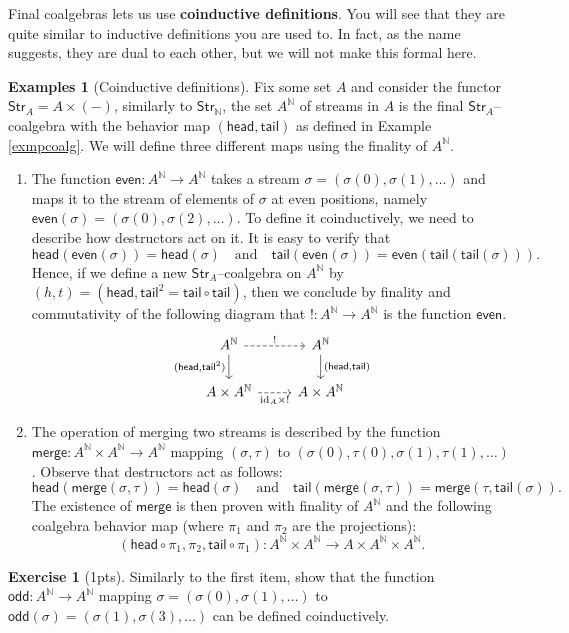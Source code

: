 \documentclass{article}
\theoremstyle{definition}
\newtheorem{exmps}[thm]{Examples}
\newtheorem{exer}{Exercise}
\theoremstyle{remark}
\newcommand{\N}{\mathbb{N}}
\newcommand{\Str}{\textsf{Str}}
\newcommand{\head}{\textsf{head}}
\newcommand{\tail}{\textsf{tail}}
\newcommand{\sfodd}{\textsf{odd}}
\newcommand{\sfmerge}{\textsf{merge}}
\newcommand{\sfeven}{\textsf{even}}
\begin{document}
Final coalgebras lets us use \textbf{coinductive definitions}. You will see that they are quite similar to inductive definitions you are used to. In fact, as the name suggests, they are dual to each other, but we will not make this formal here.
\begin{exmps}[Coinductive definitions]
	Fix some set $A$ and consider the functor $\Str_A = A \times (-)$, similarly to $\Str_\N$, the set $A^{\N}$ of streams in $A$ is the final $\Str_A$--coalgebra with the behavior map $(\head, \tail)$ as defined in Example \ref{exmpcoalg}. We will define three different maps using the finality of $A^{\N}$.
	
	\begin{enumerate}
		\item The function $\sfeven: A^{\N}\rightarrow A^{\N}$ takes a stream $\sigma = (\sigma(0), \sigma(1), \dots)$ and maps it to the stream of elements of $\sigma$ at even positions, namely $\sfeven(\sigma) = (\sigma(0), \sigma(2), \dots )$. To define it coinductively, we need to describe how destructors act on it. It is easy to verify that 
		\[\head(\sfeven(\sigma)) = \head(\sigma) \quad \text{and} \quad \tail(\sfeven(\sigma)) = \sfeven(\tail(\tail(\sigma))).\]
        Hence, if we define a new $\Str_A$--coalgebra on $A^{\N}$ by $(h,t) = (\head, \tail^2 = \tail \circ \tail)$, then we conclude by finality and commutativity of the following diagram that $!:A^{\N} \rightarrow A^{\N}$ is the function $\sfeven$.
		\begin{equation}\label{diag-evendef}
			\centering
			\begin{tikzcd}
				A^{\N} \arrow[d, "{(\head, \tail^2)}"'] \arrow[r, "!", dashed] & A^{\N} \arrow[d, "{(\head, \tail)}"] \\
				A\times A^{\N} \arrow[r, "\text{id}_A \times !"', dashed]      & A\times A^{\N}                      
			\end{tikzcd}
		\end{equation}
		\item The operation of merging two streams is described by the function $\sfmerge: A^{\N} \times A^{\N} \rightarrow A^{\N}$ mapping $(\sigma, \tau)$ to $(\sigma(0), \tau(0), \sigma(1), \tau(1), \dots)$. Observe that destructors act as follows:
		\[\head(\sfmerge(\sigma, \tau)) = \head(\sigma) \quad \text{and} \quad \tail(\sfmerge(\sigma,\tau)) = \sfmerge(\tau, \tail(\sigma)).\]
		The existence of $\sfmerge$ is then proven with finality of $A^\N$ and the following coalgebra behavior map (where $\pi_1$ and $\pi_2$ are the projections):
		\[(\head\circ \pi_1, \pi_2, \tail \circ \pi_1): A^{\N} \times A^{\N} \rightarrow A \times A^{\N} \times A^{\N}.\]
	\end{enumerate}
\end{exmps}
\begin{exer}[1pts]
    Similarly to the first item, show that the function $\sfodd: A^{\N}\rightarrow A^{\N}$ mapping $\sigma = (\sigma(0), \sigma(1), \dots)$ to $\sfodd(\sigma) = (\sigma(1), \sigma(3), \dots )$ can be defined coinductively.
\end{exer}
\end{document}
